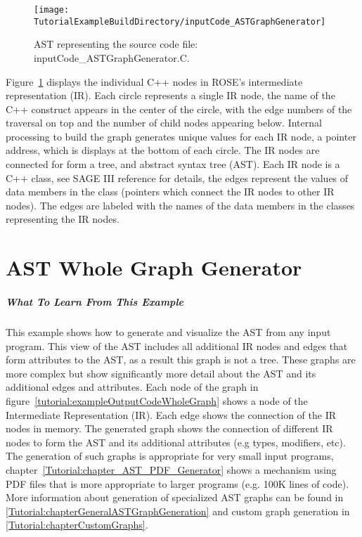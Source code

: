\begin{figure}
\texttt{[image: \\TutorialExampleBuildDirectory/inputCode\_ASTGraphGenerator]}
\caption{AST representing the source code file: inputCode\_ASTGraphGenerator.C.}
\label{tutorial:exampleOutputCodeGraph}
\end{figure}

   Figure~\ref{tutorial:exampleOutputCodeGraph} displays the individual
C++ nodes in ROSE's intermediate representation (IR).  Each circle represents
a single IR node, the name of the C++ construct appears in the center of the
circle, with the edge numbers of the traversal on top and the number of
child nodes appearing below.  Internal processing to build the graph generates
unique values for each IR node, a pointer address, which is displays at the bottom
of each circle.  The IR nodes are connected for form a tree, and abstract syntax
tree (AST). Each IR node is a C++ class, see SAGE III reference for details,
the edges represent the values of data members in the class (pointers which connect
the IR nodes to other IR nodes).  The edges are labeled with the names of the 
data members in the classes representing the IR nodes.




\chapter{AST Whole Graph Generator}
\label{Tutorial:chapterASTWholeGraphGenerator}

\paragraph{What To Learn From This Example}
This example shows how to generate and visualize the AST from any input program.
This view of the AST includes all additional IR nodes and edges that form attributes to
the AST, as a result this graph is not a tree.  These graphs are more complex but
show significantly more detail about the AST and its additional edges and attributes.
Each node of the graph in figure~\ref{tutorial:exampleOutputCodeWholeGraph} shows
a node of the Intermediate Representation (IR).  Each edge shows the connection
of the IR nodes in memory. The generated graph shows the connection of different 
IR nodes to form the AST and its additional attributes (e.g types, modifiers, etc).  
The generation of such graphs is appropriate for very small 
input programs, chapter~\ref{Tutorial:chapter_AST_PDF_Generator} shows a mechanism 
using PDF files that is more appropriate to larger programs (e.g. 100K lines of code).
More information about generation of specialized AST graphs can be found in 
\ref{Tutorial:chapterGeneralASTGraphGeneration} and custom graph generation in
\ref{Tutorial:chapterCustomGraphs}.

